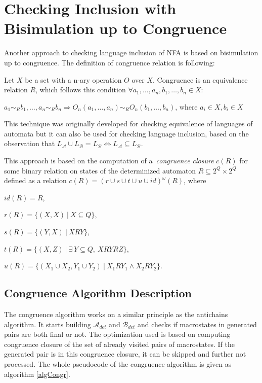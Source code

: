 \section{Checking Inclusion with Bisimulation up to Congruence}
\label{sectionCongr}
Another approach to checking language inclusion of NFA is based on bisimulation up to congruence\cite{popl13}. The definition of congruence relation is
following:

	Let $X$ be a set with a n-ary operation $O$ over $X$. Congruence is an equivalence relation $R$, 
	which follows this condition $\forall a_1,\ldots,a_n,b_1,\ldots,b_n\in X$:
		\begin{description}
			\item $a_1 \sim_{R} b_1,\ldots,a_n \sim_{R} b_n \Rightarrow O_n(a_1,\ldots,a_n) \sim_{R} O_n(b_1,\ldots,b_n)$, where $a_i \in X, b_i \in X$
		\end{description}

This technique was originally developed for checking equivalence of languages of automata but it can
also be used for checking language inclusion, based on the observation that $L_\mathcal{A}\cup L_\mathcal{B}= L_\mathcal{B} 
\Leftrightarrow L_\mathcal{A}\subseteq L_\mathcal{B}$.

  This approach is based on the computation of a~\emph{congruence closure} $c(R)$ 
  for some binary relation on states of the determinized automaton $R \subseteq 2^Q\times 2^Q$ defined 
  as a relation $c(R)=(r\cup s\cup t \cup u\cup id)^{\omega}(R)$, where
  \begin{description}
  \item $id(R)=R$, 
  \item $r(R)=\{(X,X)\ |\ X\subseteq Q\}$, 
  \item $s(R)=\{(Y,X)\ |\ XRY\}$,
  \item $t(R)=\{(X,Z)\ |\ \exists\,Y\subseteq Q,\ XRYRZ\}$,
  \item $u(R)=\{(X_1 \cup X_2,Y_1\cup Y_2)\ |\ X_1 R Y_1 \wedge X_2 R Y_2\}$. 
  \end{description}



 \subsection{Congruence Algorithm Description}
\label{subsectCongr}
The congruence algorithm works on a similar principle as the antichains algorithm. 
It starts building $\mathcal{A}_{det}$ and $\mathcal{B}_{det}$ and checks if macrostates in generated pairs are both
final or not. The optimization used is based on computing congruence closure of the set of already visited pairs of macrostates. 
If the generated pair is in this congruence closure, it can be skipped and further not processed.
	The whole pseudocode of the congruence algorithm is given as algorithm \ref{algCongr}.

